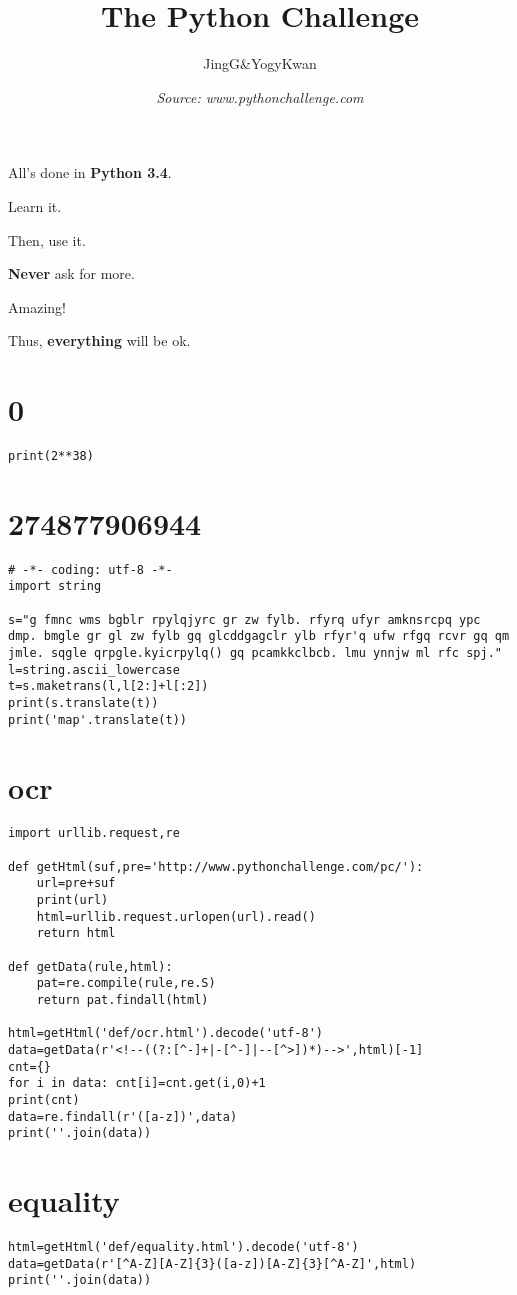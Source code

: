\documentclass[onecolumn,a4paper,12pt]{article}
\title{\textbf{The Python Challenge}}
\author{JingG\&YogyKwan}
\date{\small\it Source: www.pythonchallenge.com}
\begin{document}
\maketitle

All's done in \textbf{Python 3.4}.

Learn it.

Then, use it.

\textbf{Never} ask for more.

Amazing!

Thus, \textbf{everything} will be ok.

\section{0}
\begin{lstlisting}
print(2**38)
\end{lstlisting}

\section{274877906944}
\begin{lstlisting}
# -*- coding: utf-8 -*-
import string

s="g fmnc wms bgblr rpylqjyrc gr zw fylb. rfyrq ufyr amknsrcpq ypc dmp. bmgle gr gl zw fylb gq glcddgagclr ylb rfyr'q ufw rfgq rcvr gq qm jmle. sqgle qrpgle.kyicrpylq() gq pcamkkclbcb. lmu ynnjw ml rfc spj."
l=string.ascii_lowercase
t=s.maketrans(l,l[2:]+l[:2])
print(s.translate(t))
print('map'.translate(t))
\end{lstlisting}

\section{ocr}
\begin{lstlisting}
import urllib.request,re

def getHtml(suf,pre='http://www.pythonchallenge.com/pc/'):
    url=pre+suf
    print(url)
    html=urllib.request.urlopen(url).read()
    return html

def getData(rule,html):
    pat=re.compile(rule,re.S)
    return pat.findall(html)

html=getHtml('def/ocr.html').decode('utf-8')
data=getData(r'<!--((?:[^-]+|-[^-]|--[^>])*)-->',html)[-1]
cnt={}
for i in data: cnt[i]=cnt.get(i,0)+1
print(cnt)
data=re.findall(r'([a-z])',data)
print(''.join(data))
\end{lstlisting}

\section{equality}
\begin{lstlisting}
html=getHtml('def/equality.html').decode('utf-8')
data=getData(r'[^A-Z][A-Z]{3}([a-z])[A-Z]{3}[^A-Z]',html)
print(''.join(data))
\end{lstlisting}
\end{document}
